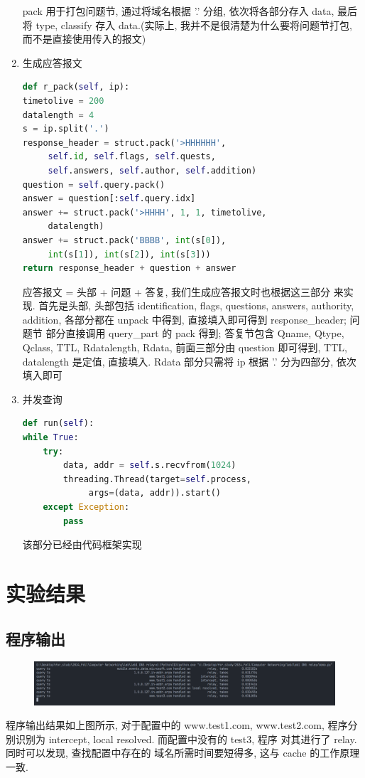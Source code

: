 \documentclass[UTF8]{ctexart}
\begin{document}
\begin{sloppypar}
\begin{enumerate}
                pack 用于打包问题节, 通过将域名根据 '.' 分组, 依次将各部分存入
                data, 最后将 type, classify 存入 data.(实际上, 我并不是很清楚为什么要将问题节打包, 而不是直接使用传入的报文)
            \item 生成应答报文
                \begin{lstlisting}[language=Python,
                    frame=single]
def r_pack(self, ip):
timetolive = 200
datalength = 4
s = ip.split('.')
response_header = struct.pack('>HHHHHH',
     self.id, self.flags, self.quests, 
     self.answers, self.author, self.addition)
question = self.query.pack()
answer = question[:self.query.idx]
answer += struct.pack('>HHHH', 1, 1, timetolive,
     datalength)
answer += struct.pack('BBBB', int(s[0]),
     int(s[1]), int(s[2]), int(s[3]))
return response_header + question + answer
                \end{lstlisting}
                应答报文 = 头部 + 问题 + 答复, 我们生成应答报文时也根据这三部分
                来实现. 首先是头部, 头部包括 identification, flags,
                 questions, answers, authority, addition, 各部分都在
                 unpack 中得到, 直接填入即可得到 response\_header; 问题节
                部分直接调用 query\_part 的 pack 得到; 答复节包含 Qname,
                 Qtype, Qclass, TTL, Rdatalength, Rdata, 前面三部分由
                 question 即可得到, TTL, datalength 是定值, 直接填入.
                 Rdata 部分只需将 ip 根据 '.' 分为四部分, 依次填入即可
            \item 并发查询
                \begin{lstlisting}[language=Python,
                    frame=single]
def run(self):
while True:
    try:
        data, addr = self.s.recvfrom(1024)
        threading.Thread(target=self.process,
             args=(data, addr)).start()
    except Exception:
        pass
                \end{lstlisting}
                该部分已经由代码框架实现
        \end{enumerate}
\section{实验结果}
    \subsection{程序输出}
        \begin{figure}[h]
            \centering
            \includegraphics[scale=0.2]{resources/programme_output1.png}
        \end{figure}
        程序输出结果如上图所示, 对于配置中的 www.test1.com,
        www.test2.com, 程序分别识别为 intercept,
        local resolved. 而配置中没有的 test3, 程序
        对其进行了 relay. 同时可以发现, 查找配置中存在的
        域名所需时间要短得多, 这与 cache 的工作原理一致.

\end{sloppypar}
\end{document}
